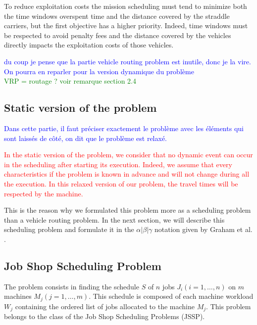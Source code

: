 \documentclass[a4paper,10pt]{article}
\begin{document}
To reduce exploitation costs the mission scheduling must tend to minimize both the time windows overspent time and the distance covered by the straddle carriers, but the first objective has a higher priority. Indeed, time windows must be respected to avoid penalty fees and the distance covered by the vehicles directly impacts the exploitation costs of those vehicles. %

\textcolor{blue}{du coup je pense que la partie vehicle routing problem est inutile, donc je la vire. On pourra en reparler pour la version dynamique du problème} \\
\textcolor{green}{VRP = routage ? voir remarque section 2.4}

\subsection{Static version of the problem}

\textcolor{blue}{Dans cette partie, il faut préciser exactement le problème avec les éléments qui sont laissés de côté, on dit que le problème est relaxé.}

\textcolor{red}{In the static version of the problem, we consider that no dynamic event can occur in the scheduling after starting its execution. Indeed, we assume that every characteristics if the problem is known in advance and will not change during all the execution. In this relaxed version of our problem, the travel times will be respected by the machine.}

This is the reason why we formulated this problem more as a scheduling problem than a vehicle routing problem. In the next section, we will describe this scheduling problem and formulate it in the $\alpha|\beta|\gamma$ notation given by Graham et al. \cite{Graham1979}.

\subsection{Job Shop Scheduling Problem}

The problem consists in finding the schedule $S$ of $n$ jobs $J_i(i=1,\ldots,n)$ on $m$ machines $M_j(j=1,\ldots,m)$. 
This schedule is composed of each machine workload $W_{j}$ containing the ordered list of jobs allocated to the machine $M_j$. This problem belongs to the class of the Job Shop Scheduling Problems (JSSP).
\end{document}
